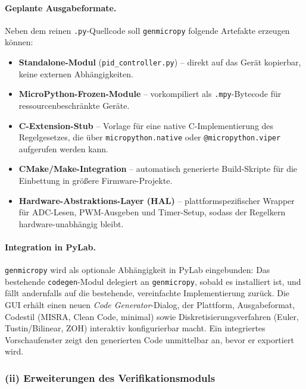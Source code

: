 \documentclass[a4paper,12pt]{article}
\theoremstyle{definition}
\begin{document}
\paragraph{Geplante Ausgabeformate.}
Neben dem reinen \texttt{.py}-Quellcode soll \texttt{genmicropy} folgende
Artefakte erzeugen können:
\begin{itemize}
    \item \textbf{Standalone-Modul} (\texttt{pid\_controller.py}) -- direkt auf
          das Gerät kopierbar, keine externen Abhängigkeiten.
    \item \textbf{MicroPython-Frozen-Module} -- vorkompiliert als
          \texttt{.mpy}-Bytecode für ressourcenbeschränkte Geräte.
    \item \textbf{C-Extension-Stub} -- Vorlage für eine native
          C-Implementierung des Regelgesetzes, die über \texttt{micropython.native}
          oder \texttt{@micropython.viper} aufgerufen werden kann.
    \item \textbf{CMake/Make-Integration} -- automatisch generierte Build-Skripte
          für die Einbettung in größere Firmware-Projekte.
    \item \textbf{Hardware-Abstraktions-Layer (HAL)} -- plattformspezifischer
          Wrapper für ADC-Lesen, PWM-Ausgeben und Timer-Setup, sodass der
          Regelkern hardware-unabhängig bleibt.
\end{itemize}

\paragraph{Integration in PyLab.}
\texttt{genmicropy} wird als optionale Abhängigkeit in PyLab eingebunden: Das
bestehende \texttt{codegen}-Modul delegiert an \texttt{genmicropy}, sobald es
installiert ist, und fällt andernfalls auf die bestehende, vereinfachte
Implementierung zurück. Die GUI erhält einen neuen \emph{Code Generator}-Dialog,
der Plattform, Ausgabeformat, Codestil (MISRA, Clean Code, minimal) sowie
Diskretisierungsverfahren (Euler, Tustin/Bilinear, ZOH) interaktiv konfigurierbar
macht. Ein integriertes Vorschaufenster zeigt den generierten Code unmittelbar
an, bevor er exportiert wird.

\subsubsection*{(ii) Erweiterungen des Verifikationsmoduls}
\end{document}
